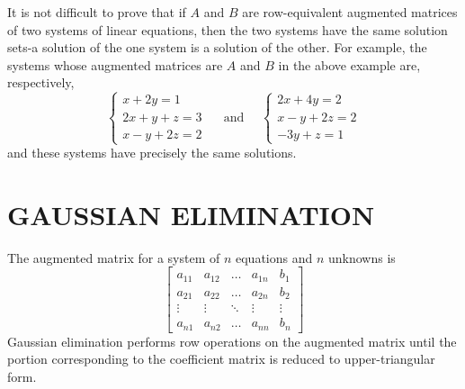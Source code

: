 \documentclass[../main.tex]{subfiles}
\begin{document}
It is not difficult to prove that if $A$ and $B$ are row-equivalent augmented matrices of two systems of linear equations, then the two systems have the same solution sets-a solution of the one system is a solution of the other. For example, the systems whose augmented matrices are $A$ and $B$ in the above example are, respectively,
$$
\left\{\begin{array} { l }
{ x + 2 y = 1 } \\
{ 2 x + y + z = 3 } \\
{ x - y + 2 z = 2 }
\end{array} \quad \text { and } \quad \left\{\begin{array}{l}
2 x+4 y=2 \\
x-y+2 z=2 \\
-3 y+z=1
\end{array}\right.\right.
$$
and these systems have precisely the same solutions.


\section[Gauss Elimination]{GAUSSIAN ELIMINATION}
The augmented matrix for a system of $n$ equations and $n$ unknowns is
$$
\left[\begin{array}{cccc|c}
a_{11} & a_{12} & \ldots & a_{1 n} & b_{1} \\
a_{21} & a_{22} & \ldots & a_{2 n} & b_{2} \\
\vdots & \vdots & \ddots & \vdots & \vdots \\
a_{n 1} & a_{n 2} & \ldots & a_{n n} & b_{n}
\end{array}\right]
$$
Gaussian elimination performs row operations on the augmented matrix until the portion corresponding to the coefficient matrix is reduced to upper-triangular form.
\end{document}
